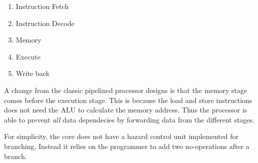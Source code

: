 \begin{enumerate}
	\item Instruction Fetch \label{stage:if}
	\item Instruction Decode \label{stage:id}
	\item Memory \label{stage:mem}
	\item Execute \label{stage:ex}
	\item Write back \label{stage:wb}
\end{enumerate}

A change from the classic pipelined processor designs is that the memory stage comes before the execution stage.
This is because the load and store instructions does not need the ALU to calculate the memory address.
Thus the processor is able to prevent \textit{all} data dependecies by forwarding data from the different stages.

For simplicity, the core does not have a hazard control unit implemented for branching.
Instead it relies on the programmer to add two no-operations after a branch.


